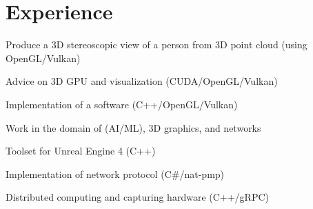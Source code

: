 \documentclass[a4paper]{deedy-resume} %
\begin{document}
\hfill%
%
%
\begin{minipage}[t]{0.66\textwidth} %


\section{Experience}


	Produce a 3D stereoscopic view of a person from 3D point cloud (using 
	OpenGL/Vulkan)
	\vspace{\topsep} %
	\begin{tightitemize}
		\item Advice on 3D GPU and visualization (CUDA/OpenGL/Vulkan)
		\item Implementation of a software (C++/OpenGL/Vulkan)
	\end{tightitemize}

\sectionspace


	Work in the domain of (AI/ML), 3D graphics, and networks
	\begin{tightitemize}
		\item Toolset for Unreal Engine 4 (C++)
		\item Implementation of network protocol (C\#/nat-pmp)
		\item Distributed computing and capturing hardware (C++/gRPC)
	\end{tightitemize}

\sectionspace



\end{minipage}
\end{document}
